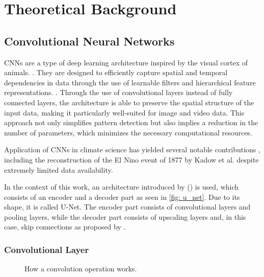 \section{Theoretical Background}
\label{sec: theory}

\subsection{Convolutional Neural Networks}
\label{subsec: cnn}

CNNs are a type of deep learning architecture inspired by the visual cortex of animals. \cite{Yamashita2018CNN, hubel1968receptive}. They are designed to efficiently capture spatial and temporal dependencies in data through the use of learnable filters and hierarchical feature representations. \cite{Yamashita2018CNN}. Through the use of convolutional layers instead of fully connected layers, the architecture is able to preserve the spatial structure of the input data, making it particularly well-suited for image and video data. This approach not only simplifies pattern detection but also implies a reduction in the number of parameters, which minimizes the necessary computational resources.

Application of CNNs in climate science has yielded several notable contributions \cite{barnes2019,racah2017}, including the reconstruction of the El Nino event of 1877 by Kadow et al. despite extremely limited data availability. \cite{kadow2020}

In the context of this work, an architecture introduced by (\cite{ronneberger2015}) is used, which consists of an encoder and a decoder part as seen in \autoref{fig: u_net}. Due to its shape, it is called U-Net. The encoder part consists of convolutional layers and pooling layers, while the decoder part consists of upscaling layers and, in this case, skip connections as proposed by \cite{liu2018inpaining}.

\subsubsection*{Convolutional Layer}
\begin{figure}[H]
    \centering
    \caption{How a convolution operation works.}
    \label{fig: convolution_operation}
\end{figure}

